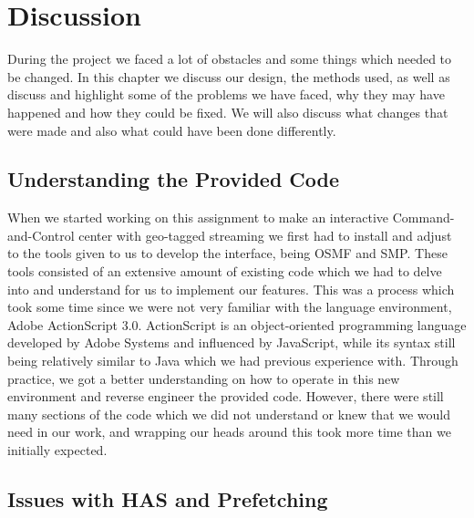 \chapter{Discussion}
\label{cha:discussion}


During the project we faced a lot of obstacles and some things which needed to be changed. In this chapter we discuss our design, the methods used, as well as discuss and highlight some of the problems we have faced, why they may have happened and how they could be fixed. We will also discuss what changes that were made and also what could have been done differently.


\section{Understanding the Provided Code}
\label{sec:understandingcode}

When we started working on this assignment to make an interactive Command-and-Control center with geo-tagged streaming we first had to install and adjust to the tools given to us to develop the interface, being OSMF and SMP. These tools consisted of an extensive amount of existing code which we had to delve into and understand for us to implement our features.
This was a process which took some time since we were not very familiar with the language environment, Adobe ActionScript 3.0. ActionScript is an object-oriented programming language developed by Adobe Systems and influenced by JavaScript, while its syntax still being relatively similar to Java which we had previous experience with. Through practice, we got a better understanding on how to operate in this new environment and reverse engineer the provided code. However, there were still many sections of the code which we did not understand or knew that we would need in our work, and wrapping our heads around this took more time than we initially expected. 

\section{Issues with HAS and Prefetching}
\label{sec:hasissues}

